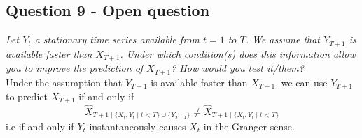 \documentclass[]{article}
\begin{document}
\subsection{Question 9 -  Open question}
\textit{Let $Y_t$ a stationary time series available from $t=1$ to $T$. We assume that $Y_{T+1}$ is available faster than $X_{T+1}$. Under which condition(s) does this information allow you to improve the prediction of $X_{T+1}$? How would you test it/them?}\\

Under the assumption that $Y_{T+1}$ is available faster than $X_{T+1}$, we can use $Y_{T+1}$ to predict $X_{T+1}$ if and only if
\begin{equation}
	\hat{X}_{T+1\mid \{X_t, Y_t\mid t<T\}\cup \{Y_{T+1}\}} \ne \hat{X}_{T+1\mid \{X_t, Y_t\mid t<T\}}
\end{equation}
i.e if and only if $Y_t$ instantaneously causes $X_t$ in the Granger sense.
\end{document}
